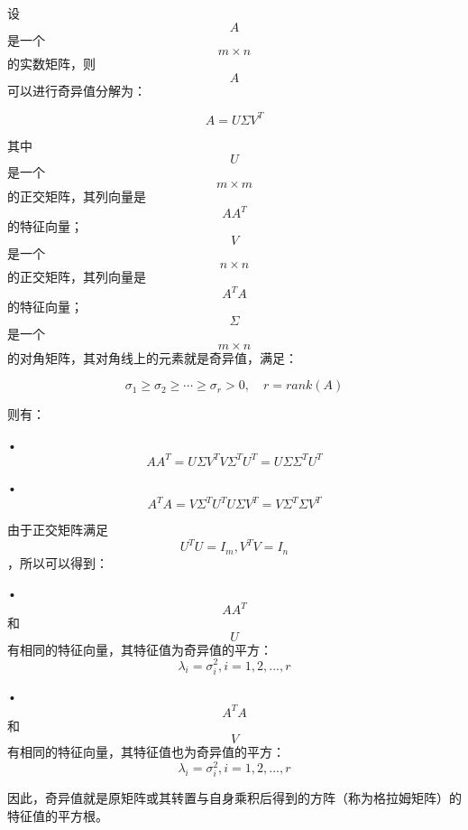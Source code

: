 
设$$A$$是一个$$m \times n$$的实数矩阵，则$$A$$可以进行奇异值分解为：

$$A = U \Sigma V^T$$

其中$$U$$是一个$$m \times m$$的正交矩阵，其列向量是$$A A^T$$的特征向量；$$V$$是一个$$n \times n$$的正交矩阵，其列向量是$$A^T A$$的特征向量；$$\Sigma$$是一个$$m \times n$$的对角矩阵，其对角线上的元素就是奇异值，满足：

$$\sigma_1 \geq \sigma_2 \geq \cdots \geq \sigma_r > 0, \quad r = rank(A)$$

则有：

•  $$A A^T = U \Sigma V^T V \Sigma^T U^T = U \Sigma \Sigma^T U^T$$

•  $$A^T A = V \Sigma^T U^T U \Sigma V^T = V \Sigma^T \Sigma V^T$$

由于正交矩阵满足$$U^T U = I_m, V^T V = I_n$$，所以可以得到：

•  $$A A^T$$和$$U$$有相同的特征向量，其特征值为奇异值的平方：$$\lambda_i = \sigma_i^2, i = 1, 2, ..., r$$

•  $$A^T A$$和$$V$$有相同的特征向量，其特征值也为奇异值的平方：$$\lambda_i = \sigma_i^2, i = 1, 2, ..., r$$

因此，奇异值就是原矩阵或其转置与自身乘积后得到的方阵（称为格拉姆矩阵）的特征值的平方根。